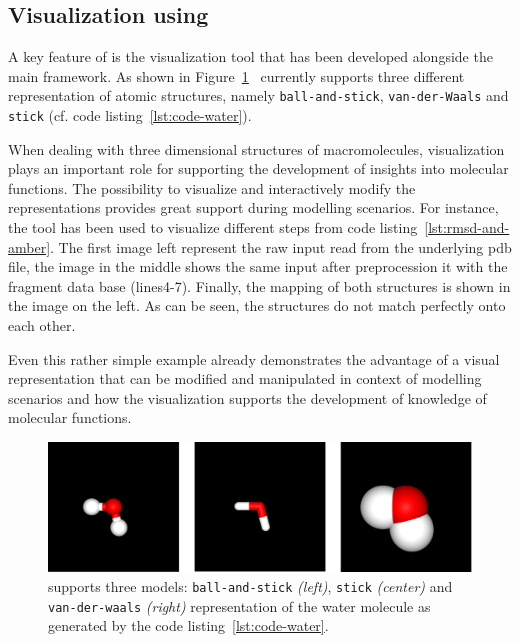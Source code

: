 \subsection{Visualization using \bioviz}

A key feature of \biochem is the visualization tool \textit{\bioviz} that
has been developed alongside the main framework. As shown in Figure~\ref{fig:biochem_water} \ \bioviz currently supports three different representation of atomic structures, namely \texttt{ball-and-stick}, \texttt{van-der-Waals} and \texttt{stick} (cf. code listing~\ref{lst:code-water}).

When dealing with three dimensional structures of macromolecules, visualization plays an important role for supporting the development of insights into molecular functions. The possibility to visualize and interactively modify the representations provides great support during modelling scenarios. For instance, the tool has been used to visualize different steps from code listing~\ref{lst:rmsd-and-amber}. The first image left represent the raw input read from the underlying pdb file, the image in the middle shows the same input after preprocession it with the fragment data base (lines4-7). Finally, the mapping of both structures is shown in the image on the left. As can be seen, the structures do not match perfectly onto each other. 

Even this rather simple example already demonstrates the advantage of a visual representation that can be modified and manipulated in context of modelling scenarios and how the visualization supports the development of knowledge of molecular functions.

 \begin{figure}[t]
	\includegraphics[width=18cm]{gfx/biovis-2.png}
	\caption{\bioviz supports three models:  \texttt{ball-and-stick} \textit{(left)}, \texttt{stick} \textit{(center)} and \texttt{van-der-waals} \textit{(right)} representation of the water molecule as generated by the code listing~\ref{lst:code-water}.}
	\label{fig:biochem_water}
\end{figure}

